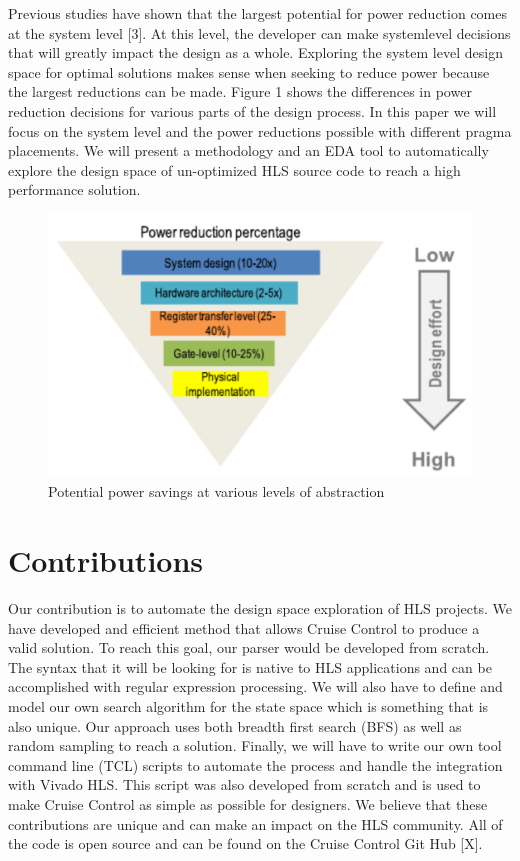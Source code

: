\documentclass[letterpaper, 10 pt, conference]{IEEEconf}  %
\begin{document}
Previous studies have shown that the largest potential for power reduction comes at the system level [3]. At this level, the developer can make system\-level decisions that will greatly impact the design as a whole. Exploring the system level design space for optimal solutions makes sense when seeking to reduce power because the largest reductions can be made. Figure 1 shows the differences in power reduction decisions for various parts of the design process. In this paper we will focus on the system level and the power reductions possible with different pragma placements. We will present a methodology and an EDA tool to automatically explore the design space of un-optimized HLS source code to reach a high performance solution. 

\begin{figure}[H]
\centering
\includegraphics[scale=.4]{Picture1.png} 
\caption{Potential power savings at various levels of abstraction}
\end{figure}

\section{Contributions}
Our contribution is to automate the design space exploration of HLS projects. We have developed and efficient method that allows Cruise Control to produce a valid solution. To reach this goal, our parser would be developed from scratch. The syntax that it will be looking for is native to HLS applications and can be accomplished  with regular expression processing. We will also have to define and model our own search algorithm for the state space which is something that is also unique. Our approach uses both breadth first search (BFS) as well as random sampling to reach a solution.  Finally, we will have to write our own tool command line (TCL) scripts to automate the process and handle the integration with Vivado HLS. This script was also developed from scratch and is used to make Cruise Control as simple as possible for designers. We believe that these contributions are unique and can make an impact on the HLS community. All of the code is open source and can be found on the Cruise Control Git Hub [X]. 
\end{document}
